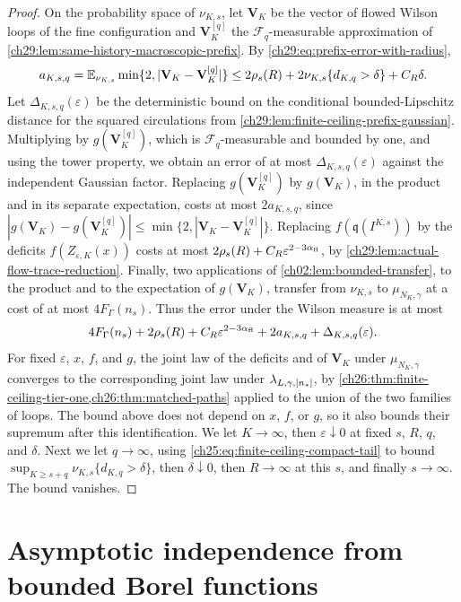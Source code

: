 \begin{proof}
On the probability space of $\nu_{K,s}$, let $\mathbf V_K$ be the vector of flowed Wilson loops of the fine configuration and $\mathbf V_K^{[q]}$ the $\mathcal F_q$-measurable approximation of \cref{ch29:lem:same-history-macroscopic-prefix}. By \eqref{ch29:eq:prefix-error-with-radius},
\[
 a_{K,s,q}=\mathbb E_{\nu_{K,s}}\min\{2,|\mathbf V_K-\mathbf V_K^{[q]}|\}\le2\rho_s(R)+2\nu_{K,s}\{d_{K,q}>\delta\}+C_R\delta.
\]
Let $\Delta_{K,s,q}(\varepsilon)$ be the deterministic bound on the conditional bounded-Lipschitz distance for the squared circulations from \cref{ch29:lem:finite-ceiling-prefix-gaussian}. Multiplying by $g(\mathbf V_K^{[q]})$, which is $\mathcal F_q$-measurable and bounded by one, and using the tower property, we obtain an error of at most $\Delta_{K,s,q}(\varepsilon)$ against the independent Gaussian factor. Replacing $g(\mathbf V_K^{[q]})$ by $g(\mathbf V_K)$, in the product and in its separate expectation, costs at most $2a_{K,s,q}$, since $|g(\mathbf V_K)-g(\mathbf V_K^{[q]})|\le\min\{2,|\mathbf V_K-\mathbf V_K^{[q]}|\}$. Replacing $f(\mathfrak q(I^{K,s}))$ by the deficits $f(Z_{\varepsilon,K}(x))$ costs at most $2\rho_s(R)+C_R\varepsilon^{2-3\alpha_{\mathrm{fl}}}$, by \cref{ch29:lem:actual-flow-trace-reduction}. Finally, two applications of \cref{ch02:lem:bounded-transfer}, to the product and to the expectation of $g(\mathbf V_K)$, transfer from $\nu_{K,s}$ to $\mu_{N_K,\gamma}$ at a cost of at most $4F_\Gamma(n_s)$. Thus the error under the Wilson measure is at most
\[
 4F_\Gamma(n_s)+2\rho_s(R)+C_R\varepsilon^{2-3\alpha_{\mathrm{fl}}}+2a_{K,s,q}+\Delta_{K,s,q}(\varepsilon).
\]
For fixed $\varepsilon$, $x$, $f$, and $g$, the joint law of the deficits and of $\mathbf V_K$ under $\mu_{N_K,\gamma}$ converges to the corresponding joint law under $\lambda_{L,\gamma,[n_*]}$, by \cref{ch26:thm:finite-ceiling-tier-one,ch26:thm:matched-paths} applied to the union of the two families of loops. The bound above does not depend on $x$, $f$, or $g$, so it also bounds their supremum after this identification. We let $K\to\infty$, then $\varepsilon\downarrow0$ at fixed $s$, $R$, $q$, and $\delta$. Next we let $q\to\infty$, using \eqref{ch25:eq:finite-ceiling-compact-tail} to bound $\sup_{K\ge s+q}\nu_{K,s}\{d_{K,q}>\delta\}$, then $\delta\downarrow0$, then $R\to\infty$ at this $s$, and finally $s\to\infty$. The bound vanishes.
\end{proof}

\section{Asymptotic independence from bounded Borel functions}\label{ch29:sec:orbit-borel-mixing-addendum}

